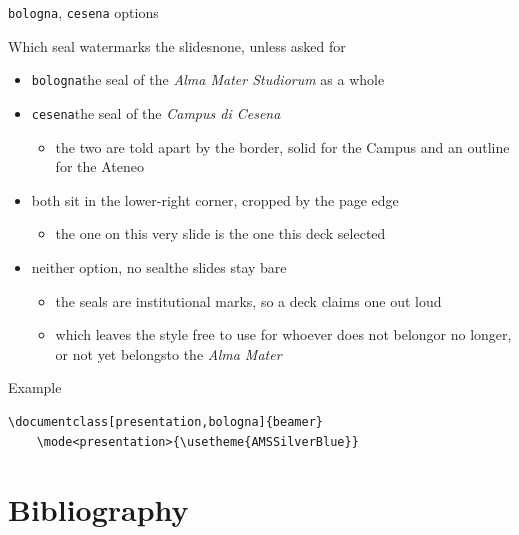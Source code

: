 \documentclass[presentation,cesena,apice]{beamer}\mode<presentation>{\usetheme{AMSSilverBlue}}
\begin{document}
\begin{frame}[c,fragile]{\texttt{bologna}, \texttt{cesena} options}
%
\begin{alertblock}{Which seal watermarks the slides\textemdash{}none, unless asked for}
\begin{itemize}
	\item \texttt{bologna}\textemdash{}the seal of the \emph{Alma Mater Studiorum} as a whole
	\item \texttt{cesena}\textemdash{}the seal of the \emph{Campus di Cesena}
	\begin{itemize}
		\item the two are told apart by the border, solid for the Campus and an outline for the Ateneo
	\end{itemize}
	\item both sit in the lower-right corner, cropped by the page edge
	\begin{itemize}
		\item the one on this very slide is the one this deck selected
	\end{itemize}
	\item \alert{neither option, no seal}\textemdash{}the slides stay bare
	\begin{itemize}
		\item the seals are institutional marks, so a deck claims one out loud
		\item which leaves the style free to use for whoever does not belong\textemdash{}or no longer, or not yet belongs\textemdash{}to the \emph{Alma Mater}
	\end{itemize}
\end{itemize}
\end{alertblock}
%
\begin{exampleblock}{Example}
{\scriptsize\begin{verbatim}
\documentclass[presentation,bologna]{beamer}
    \mode<presentation>{\usetheme{AMSSilverBlue}}
\end{verbatim}} %
\end{exampleblock}
%
\end{frame}

\section{Bibliography}
\end{document}
